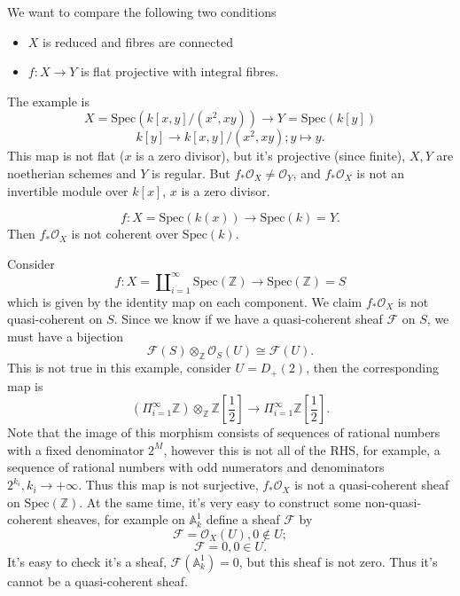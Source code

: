 \documentclass[../main.tex]{subfiles}
\begin{document}
\begin{example}
We want to compare the following two conditions
\begin{itemize}
\item $X$ is reduced and fibres are connected
\item $f:X\rightarrow Y$ is flat projective with integral fibres.
\end{itemize}
The example is 
$$X=\mathrm{Spec}(k[x,y]/(x^{2},xy))\rightarrow Y=\mathrm{Spec}(k[y])$$
$$k[y]\rightarrow k[x,y]/(x^{2},xy); y\mapsto y.$$
This map is not flat ($x$ is a zero divisor), but it's projective (since finite), $X,Y$ are noetherian schemes and $Y$ is regular. But $f_{*}\mathcal{O}_{X}\neq \mathcal{O}_{Y}$, and $f_{*}\mathcal{O}_{X}$ is not an invertible module over $k[x]$, $x$ is a zero divisor.
\end{example}






\begin{example}
$$f:X=\mathrm{Spec}(k(x))\rightarrow \mathrm{Spec}(k)=Y.$$
Then $f_{*}\mathcal{O}_{X}$ is not coherent over $\mathrm{Spec}(k).$
\end{example}

\begin{example}
Consider $$f:X=\amalg_{i=1}^{\infty}\mathrm{Spec}(\mathbb{Z})\rightarrow \mathrm{Spec}(\mathbb{Z})=S$$
which is given by the identity map on each component. We claim $f_{*}\mathcal{O}_{X}$ is not quasi-coherent on $S$. Since we know if we have a quasi-coherent sheaf $\mathscr{F}$ on $S$, we must have a bijection
$$\mathscr{F}(S)\otimes_{\mathbb{Z}}\mathcal{O}_{S}(U)\cong \mathscr{F}(U).$$
This is not true in this example, consider $U=D_{+}(2)$, then the corresponding map is
$$(\Pi_{i=1}^{\infty}\mathbb{Z})\otimes_{\mathbb{Z}}\mathbb{Z}[\frac{1}{2}]\rightarrow \Pi_{i=1}^{\infty}\mathbb{Z}[\frac{1}{2}].$$
Note that the image of this morphism consists of sequences of rational numbers with a fixed denominator $2^{M}$, however this is not all of the RHS, for example, a sequence of rational numbers with odd numerators and denominators $2^{k_{i}}, k_{i}\rightarrow +\infty$. Thus this map is not surjective, $f_{*}\mathcal{O}_{X}$ is not a quasi-coherent sheaf on $\mathrm{Spec}(\mathbb{Z}).$ At the same time, it's very easy to construct some non-quasi-coherent sheaves, for example on $\mathbb{A}_{k}^{1}$ define a sheaf $\mathscr{F}$ by 
$$\mathscr{F}=\mathcal{O}_{X}(U), 0\notin U;$$
$$\mathscr{F}=0, 0\in U.$$
It's easy to check it's a sheaf, $\mathscr{F}(\mathbb{A}_{k}^{1})=0$, but this sheaf is not zero. Thus it's cannot be a quasi-coherent sheaf. 
\end{example}
\end{document}
